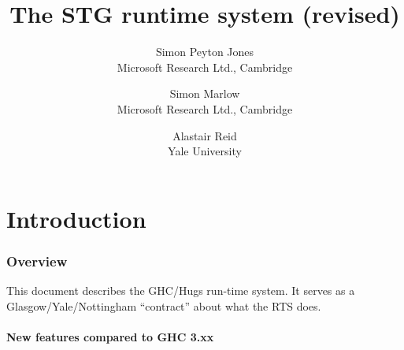 \documentclass[11pt]{article}
\newcommand{\Section}[2]{\section{#1}\label{sec:#2}}
\newcommand{\Subsection}[2]{\subsection{#1}\label{sec:#2}}
\begin{document}
\title{The STG runtime system (revised)}
\author{Simon Peyton Jones \\ Microsoft Research Ltd., Cambridge \and
Simon Marlow \\ Microsoft Research Ltd., Cambridge \and
Alastair Reid \\ Yale University} 

\maketitle

\tableofcontents
\newpage

\part{Introduction}
\Section{Overview}{overview}

This document describes the GHC/Hugs run-time system.  It serves as 
a Glasgow/Yale/Nottingham ``contract'' about what the RTS does.

\Subsection{New features compared to GHC 3.xx}{new-features}
\end{document}
